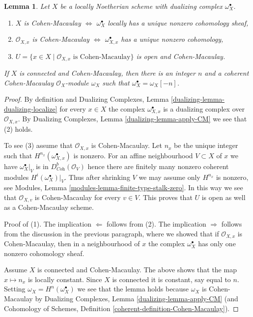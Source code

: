 \documentclass{stacks-project}
\theoremstyle{plain}
\newtheorem{lemma}[subsection]{Lemma}
\theoremstyle{definition}
\theoremstyle{remark}
\numberwithin{equation}{subsection}
\begin{document}
\begin{lemma}
\label{lemma-dualizing-module-CM-scheme}
Let $X$ be a locally Noetherian scheme with dualizing complex
$\omega_X^\bullet$.
\begin{enumerate}
\item $X$ is Cohen-Macaulay $\Leftrightarrow$ $\omega_X^\bullet$
locally has a unique nonzero cohomology sheaf,
\item $\mathcal{O}_{X, x}$ is Cohen-Macaulay $\Leftrightarrow$
$\omega_{X, x}^\bullet$ has a unique nonzero cohomology,
\item $U = \{x \in X \mid \mathcal{O}_{X, x}\text{ is Cohen-Macaulay}\}$
is open and Cohen-Macaulay.
\end{enumerate}
If $X$ is connected and Cohen-Macaulay, then there is an integer $n$
and a coherent Cohen-Macaulay $\mathcal{O}_X$-module $\omega_X$
such that $\omega_X^\bullet = \omega_X[-n]$.
\end{lemma}

\begin{proof}
By definition and Dualizing Complexes, Lemma
\ref{dualizing-lemma-dualizing-localize} for every $x \in X$
the complex $\omega_{X, x}^\bullet$ is a dualizing complex over
$\mathcal{O}_{X, x}$. By
Dualizing Complexes, Lemma \ref{dualizing-lemma-apply-CM}
we see that (2) holds.

\medskip\noindent
To see (3) assume that $\mathcal{O}_{X, x}$ is Cohen-Macaulay.
Let $n_x$ be the unique integer such that
$H^{n_{x}}(\omega_{X, x}^\bullet)$ is nonzero.
For an affine neighbourhood $V \subset X$
of $x$ we have $\omega_X^\bullet|_V$ is in $D^b_{\textit{Coh}}(\mathcal{O}_V)$
hence there are finitely many nonzero coherent modules
$H^i(\omega_X^\bullet)|_V$. Thus after shrinking $V$ we may assume
only $H^{n_x}$ is nonzero, see
Modules, Lemma \ref{modules-lemma-finite-type-stalk-zero}.
In this way we see that $\mathcal{O}_{X, v}$ is Cohen-Macaulay
for every $v \in V$. This proves that $U$ is open as well
as a Cohen-Macaulay scheme.

\medskip\noindent
Proof of (1). The implication $\Leftarrow$ follows from (2).
The implication $\Rightarrow$ follows from the discussion
in the previous paragraph, where we showed that if $\mathcal{O}_{X, x}$
is Cohen-Macaulay, then in a neighbourhood of $x$ the complex
$\omega_X^\bullet$ has only one nonzero cohomology sheaf.

\medskip\noindent
Assume $X$ is connected and Cohen-Macaulay. The above shows that
the map $x \mapsto n_x$ is locally constant.
Since $X$ is connected it is constant, say equal to $n$.
Setting $\omega_X = H^n(\omega_X^\bullet)$ we see that the lemma
holds because $\omega_X$ is Cohen-Macaulay by
Dualizing Complexes, Lemma \ref{dualizing-lemma-apply-CM}
(and Cohomology of Schemes, Definition
\ref{coherent-definition-Cohen-Macaulay}).
\end{proof}
\end{document}
